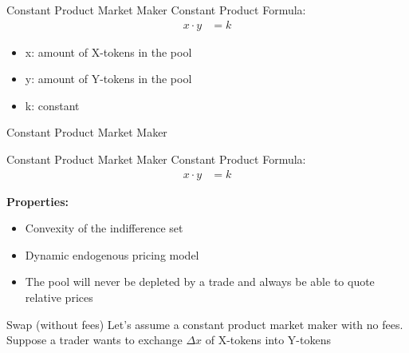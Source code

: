 \documentclass[]{beamer}
\begin{document}
\begin{frame}{Constant Product Market Maker}
Constant Product Formula:
	\begin{align*}
		x \cdot y &= k
	\end{align*}

	\begin{itemize}
		\item[] x: amount of X-tokens in the pool
		\item[] y: amount of Y-tokens in the pool
		\item[] k: constant
	\end{itemize}
	\vspace{1cm}
\end{frame}


\begin{frame}{Constant Product Market Maker}
	\begin{figure}[h!]
		\begin{center}
			
		\end{center}
	\end{figure}
\end{frame}


\begin{frame}{Constant Product Market Maker}
Constant Product Formula:
	\begin{align*}
		x \cdot y &= k
	\end{align*}
	
	\textbf{Properties:}
	\begin{itemize}
		\item<1-> Convexity of the indifference set
		\item<2-> Dynamic endogenous pricing model
		\item<3-> The pool will never be depleted by a trade and always be able to quote relative prices
	\end{itemize}
\end{frame}

\begin{frame}{Swap (without fees)}
	Let's assume a constant product market maker with no fees. Suppose a trader wants to exchange $\Delta x$ of X-tokens into Y-tokens
	\vspace{0.5cm}
	\begin{figure}[h!]
		\begin{center}
			
		\end{center}
	\end{figure}	
\end{frame}
\end{document}
